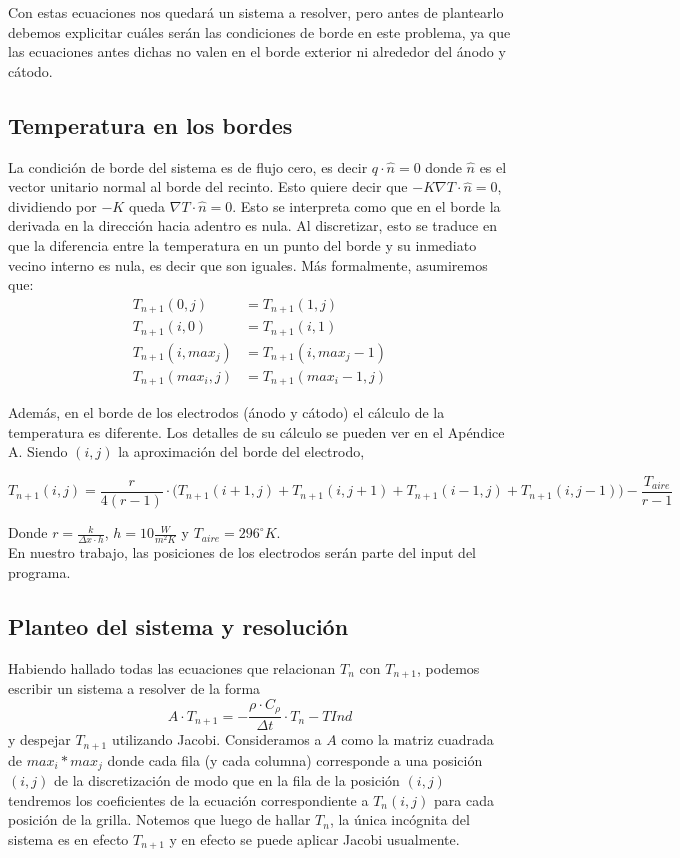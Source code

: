 \documentclass[a4paper]{article}
\begin{document}
Con estas ecuaciones nos quedará un sistema a resolver, pero antes de plantearlo debemos explicitar cuáles serán las condiciones de borde en este problema, ya que las ecuaciones antes dichas no valen en el borde exterior ni alrededor del ánodo y cátodo.

\subsection{Temperatura en los bordes}
La condición de borde del sistema es de flujo cero, es decir $q \cdot \hat{n} = 0$ donde $\hat{n}$ es el vector unitario normal al borde del recinto. Esto quiere decir que $-K \nabla T \cdot \hat{n} = 0$, dividiendo por $-K$ queda $\nabla T \cdot \hat{n} = 0$. Esto se interpreta como que en el borde la derivada en la dirección hacia adentro es nula. Al discretizar, esto se traduce en que la diferencia entre la temperatura en un punto del borde y su inmediato vecino interno es nula, es decir que son iguales. Más formalmente, asumiremos que:
\begin{equation*}
\begin{aligned}
T_{n+1}(0,j) & = T_{n+1}(1,j) \\ 
T_{n+1}(i,0) & = T_{n+1}(i,1) \\
T_{n+1}(i,max_j) & = T_{n+1}(i,max_j-1) \\ 
T_{n+1}(max_i,j) & = T_{n+1}(max_i-1,j)
\end{aligned}
\end{equation*}

Además, en el borde de los electrodos (ánodo y cátodo) el cálculo de la temperatura es diferente. Los detalles de su cálculo se pueden ver en el Apéndice A. Siendo $(i,j)$ la aproximación del borde del electrodo,

$$T_{n+1}(i,j) = \frac{r}{4(r-1)} \cdot \big( T_{n+1}(i+1,j) + T_{n+1}(i,j+1) + T_{n+1}(i-1,j) + T_{n+1}(i,j-1)\big) - \frac{T_{aire}}{r-1}$$

Donde $r = \frac{k}{\Delta x \cdot h}$, $h = 10 \frac{W}{m^2 K}$ y $T_{aire} = 296 ^\circ K$.\\ 

En nuestro trabajo, las posiciones de los electrodos serán parte del input del programa.

\subsection{Planteo del sistema y resolución}

Habiendo hallado todas las ecuaciones que relacionan $T_n$ con $T_{n+1}$, podemos escribir un sistema a resolver de la forma $$A \cdot T_{n+1} = -\frac{\rho \cdot C_\rho}{\Delta t} \cdot T_n - TInd$$ y despejar $T_{n+1}$ utilizando Jacobi. Consideramos a $A$ como la matriz cuadrada de $max_i*max_j$ donde cada fila (y cada columna) corresponde a una posición $(i, j)$ de la discretización de modo que en la fila de la posición $(i, j)$ tendremos los coeficientes de la ecuación correspondiente a $T_n(i,j)$ para cada posición de la grilla. Notemos que luego de hallar $T_n$, la única incógnita del sistema es en efecto $T_{n+1}$ y en efecto se puede aplicar Jacobi usualmente.\\
\end{document}
